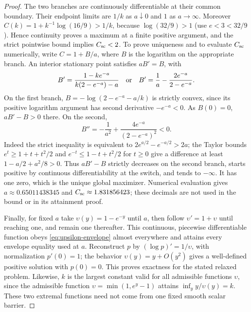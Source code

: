 \begin{proof}
The two branches are continuously differentiable at their common
boundary. Their endpoint limits are $1/k$ as $a\downarrow0$ and
$1$ as $a\to\infty$. Moreover
$C(k)=1+k^{-1}\log(16/9)>1/k$, because
$\log(32/9)>1$ (use $e<3<32/9$).
Hence continuity proves a maximum at a finite positive argument,
and the strict pointwise bound implies $C_{\mathrm{sc}}<2$.
To prove uniqueness and to evaluate $C_{\mathrm{sc}}$ numerically, write $C=1+B/a$, where $B$ is
the logarithm on the appropriate branch. An interior stationary
point satisfies $aB'=B$, with
\[
 B'=\frac{1-ke^{-a}}{k(2-e^{-a})-a}\quad\hbox{or}\quad
 B'=\frac1a-\frac{2e^{-a}}{2-e^{-a}}.
\]
On the first branch, $B=-\log(2-e^{-a}-a/k)$ is strictly
convex, since its positive logarithm argument has second derivative
$-e^{-a}<0$. As $B(0)=0$, $aB'-B>0$ there. On the second,
\[
 B''=-\frac1{a^2}+\frac{4e^{-a}}{(2-e^{-a})^2}<0.
\]
Indeed the strict inequality is equivalent to
$2e^{a/2}-e^{-a/2}>2a$; the Taylor bounds
$e^t\geq1+t+t^2/2$ and $e^{-t}\leq1-t+t^2/2$ for $t\geq0$
give a difference at least $1-a/2+a^2/8>0$.
Thus $aB'-B$ strictly decreases on the second branch, starts
positive by continuous differentiability at the switch, and tends
to $-\infty$. It has one zero, which is the unique global maximizer.
Numerical evaluation gives $a\approx0.65011438345$ and
$C_{\mathrm{sc}}\approx1.831856423$; these decimals are not used in the
bound or in its attainment proof.

Finally, for fixed $a$ take $\upsilon(y)=1-e^{-y}$ until $a$,
then follow $\upsilon'=1+\upsilon$ until reaching one, and
remain one thereafter. This continuous, piecewise differentiable
function obeys \eqref{eq:upsilon-envelope} almost everywhere and
attains every envelope equality used at $a$. Reconstruct $p$ by
$(\log p)'=1/\upsilon$, with normalization $p'(0)=1$;
the behavior $\upsilon(y)=y+O(y^2)$ gives a well-defined positive
solution with $p(0)=0$. This proves exactness for the stated relaxed
problem. Likewise, $k$ is the largest constant valid for all
admissible functions $\upsilon$, since the admissible function
$\upsilon=\min(1,e^y-1)$ attains $\inf_y y/\upsilon(y)=k$. These two
extremal functions need not come from one fixed smooth scalar barrier.
\end{proof}

